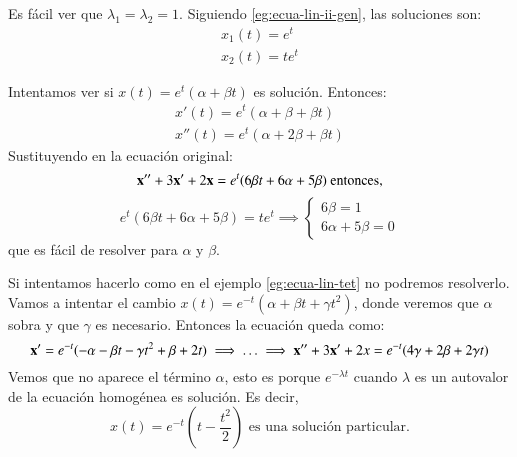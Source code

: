 \begin{eg}[Ecuación lineal de orden 2: $ \mbf{x}'' + 2\mbf{x}' + \mbf{x} = 0 $]
    Es fácil ver que $\lambda_1 = \lambda_2 = 1$. Siguiendo \ref{eg:ecua-lin-ii-gen}, las soluciones son:
    \begin{gather*}
        x_1(t) = e^{ t} \\ x_2(t) = t e^{t}
    \end{gather*}
\end{eg}

\begin{eg}[Ecuación lineal de orden 2: $\mbf{x}''+3\mbf{x}'+2\mbf{x}=te^t$ ]\label{eg:ecua-lin-tet}
    Intentamos ver si $x(t) = e^t(\alpha + \beta t)$ es solución. Entonces:
    \begin{gather*}
        x'(t) = e^{ t}(\alpha + \beta + \beta t) \\ x''(t) = e^t (\alpha + 2\beta + \beta t)
    \end{gather*}
    Sustituyendo en la ecuación original:
    $$
        \mathbf{x}''+3\mathbf{x}'+2\mathbf{x} = e^t (6 \beta t + 6 \alpha + 5 \beta) \text{ entonces,}
    $$
    $$
        e^t (6 \beta t + 6 \alpha + 5 \beta) = te^t \implies \begin{cases}
            6\beta = 1\\
            6\alpha + 5\beta = 0
    \end{cases}
    $$ que es fácil de resolver para $\alpha$ y $\beta$.
\end{eg}
\begin{eg}[Ecuación lineal de orden 2: $\mbf{x}''+3\mbf{x}'+2\mbf{x}=te^{-t}$ ]
    Si intentamos hacerlo como en el ejemplo \ref{eg:ecua-lin-tet} no podremos resolverlo.\\ Vamos a intentar el cambio $x(t) = e^{-t} (\alpha + \beta t + \gamma t^2)$, donde veremos que $\alpha$ sobra y que $\gamma$ es necesario. Entonces la ecuación queda como:
    $$
        \mathbf{x}' = e^{-t} (-\alpha -\beta t - \gamma t^2 + \beta + 2 t) \implies \ldots \implies \mathbf{x}'' + 3\mathbf{x}' + 2x = e^{-t} (4\gamma + 2\beta + 2\gamma t)
    $$
    Vemos que no aparece el término $\alpha$, esto es porque $e^{-\lambda t}$ cuando $\lambda$ es un autovalor de la ecuación homogénea es solución. Es decir,
    $$
        x(t) = e^{-t}(t-\frac{t^2}{2}) \text{ es una solución particular.}
    $$
\end{eg}
